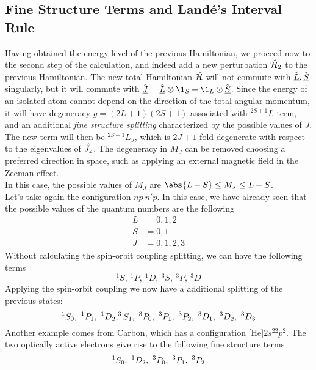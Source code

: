 \documentclass[../qm.tex]{subfiles}
\begin{document}
	\subsection{Fine Structure Terms and Landé's Interval Rule}
	Having obtained the energy level of the previous Hamiltonian, we proceed now to the second step of the calculation, and indeed add a new perturbation $\hat{\mathcal{H}}_2$ to the previous Hamiltonian. The new total Hamiltonian $\hat{\mathcal{H}}$ will not commute with $\hat{\underline{L}},\hat{\underline{S}}$ singularly, but it will commute with $\vecopr{J}=\vecopr{L}\otimes\1_S+\1_L\otimes\vecopr{S}$. Since the energy of an isolated atom cannot depend on the direction of the total angular momentum, it will have degeneracy $g=(2L+1)(2S+1)$ associated with $^{2S+1}L$ term, and an additional \textit{fine structure splitting} characterized by the possible values of $J$. The new term will then be $^{2S+1}L_J$, which is $2J+1$-fold degenerate with respect to the eigenvalues of $\hat{J}_z$. The degeneracy in $M_J$ can be removed choosing a preferred direction in space, such as applying an external magnetic field in the Zeeman effect.\\
	In this case, the possible values of $M_J$ are $\abs{L-S}\le M_J\le L+S$.\\
	Let's take again the configuration $np\ n'p$. In this case, we have already seen that the possible values of the quantum numbers are the following
	\begin{equation}
		\begin{aligned}
			L&=0,1,2\\
			S&=0,1\\
			J&=0,1,2,3
		\end{aligned}
		\label{eq:npnprimepconf}
	\end{equation}
	Without calculating the spin-orbit coupling splitting, we can have the following terms
	\begin{equation*}
		^1S,\ ^1P,\ ^1D,\ ^3S,\ ^3P,\ ^3D
	\end{equation*}
	Applying the spin-orbit coupling we now have a additional splitting of the previous states:
	\begin{equation*}
		\term[0]{S}{1},\ \term[1]{P}{1},\ \term[2]{D}{1},\term[1]{S}{3},\ \term[0]{P}{3},\ \term[1]{P}{3},\ \term[2]{P}{3},\ \term[1]{D}{3},\ \term[2]{D}{3},\ \term[3]{D}{3}
	\end{equation*}
	Another example comes from Carbon, which has a configuration [He]$2s^22p^2$. The two optically active electrons give rise to the following fine structure terms
	\begin{equation*}
		\term[0]{S}{1},\ \term[2]{D}{1},\ \term[0]{P}{3},\ \term[1]{P}{3},\ \term[2]{P}{3}
	\end{equation*}
\end{document}
